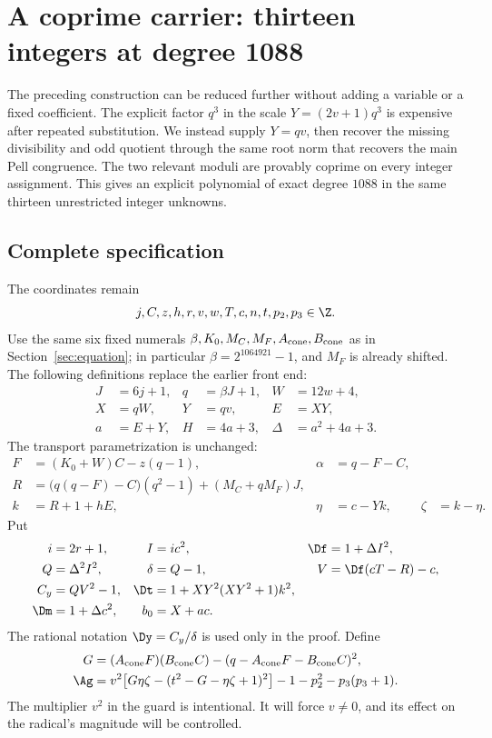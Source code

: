 \section{A coprime carrier: thirteen integers at degree 1088}
\label{sec:crt1088}

The preceding construction can be reduced further without adding a
variable or a fixed coefficient. The explicit factor \(q^3\) in the
scale \(Y=(2v+1)q^3\) is expensive after repeated substitution. We instead
supply \(Y=qv\), then recover the missing divisibility and odd quotient
through the same root norm that recovers the main Pell congruence.
The two relevant moduli are provably coprime on every integer assignment.
This gives an explicit polynomial of exact degree \(1088\) in the same
thirteen unrestricted integer unknowns.

\subsection{Complete specification}

The coordinates remain
\[
j,C,z,h,r,v,w,T,c,n,t,p_2,p_3\in\Z.
\]
Use the same six fixed numerals \(\beta,K_0,M_C,M_F,
A_{\rm cone},B_{\rm cone}\) as in Section~\ref{sec:equation}; in
particular \(\beta=2^{1064921}-1\), and \(M_F\) is already shifted.
The following definitions replace the earlier front end:
\begin{align}
J&=6j+1,&q&=\beta J+1,&W&=12w+4,\nonumber\\
X&=qW,&Y&=qv,&E&=XY,\nonumber\\
a&=E+Y,&H&=4a+3,&\Delta&=a^2+4a+3.
\label{eq:crtfront}
\end{align}
The transport parametrization is unchanged:
\begin{align}
F&=(K_0+W)C-z(q-1),&\alpha&=q-F-C,\nonumber\\
R&=\bigl(q(q-F)-C\bigr)(q^2-1)+(M_C+qM_F)J,\nonumber\\
k&=R+1+hE,&\eta&=c-Yk,&\zeta&=k-\eta.
\label{eq:crttransport}
\end{align}
Put
\begin{align}
i&=2r+1,&I&=ic^2,&\Df&=1+\Delta I^2,\nonumber\\
Q&=\Delta^2I^2,&\delta&=Q-1,&V&=\Df(cT-R)-c,\nonumber\\
C_y&=QV^2-1,&\Dt&=1+XY^2(XY^2+1)k^2,\nonumber\\
\Dm&=1+\Delta c^2,&b_0&=X+ac.
\label{eq:crtpell}
\end{align}
The rational notation \(\Dy=C_y/\delta\) is used only in the proof.
Define
\begin{align}
G&=(A_{\rm cone}F)(B_{\rm cone}C)
   -(q-A_{\rm cone}F-B_{\rm cone}C)^2,\nonumber\\
\Ag&=v^2\bigl[G\eta\zeta-(t^2-G-\eta\zeta+1)^2\bigr]
       -1-p_2^2-p_3(p_3+1).
\label{eq:crtguard}
\end{align}
The multiplier \(v^2\) in the guard is intentional. It will force
\(v\ne0\), and its effect on the radical's magnitude will be controlled.

